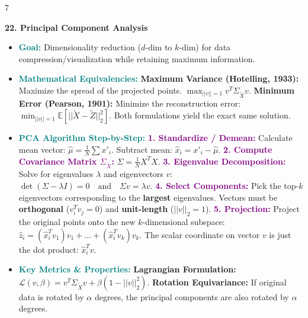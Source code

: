 \documentclass{article}
\newcommand{\hlhighlight}[1]{\par\vspace{1.5pt}\noindent\colorbox{yellow!50}{\parbox{\dimexpr\columnwidth-2\fboxsep\relax}{\textbf{#1}}}\par\vspace{0.5pt}}
\newcommand{\sectitle}[1]{\par\textbf{\color{blue!70!black}{#1}}\par}
\newcommand{\concept}[1]{\textcolor{teal}{\textbf{#1}}}
\newcommand{\procname}[1]{\textcolor{purple}{\textbf{#1}}}
\newcommand{\lbl}[1]{\textcolor{green!60!black}{\textbf{#1}}}
\begin{document}
\begin{multicols}{7}
\hlhighlight{22. Principal Component Analysis}
\sectitle{Dimensionality Reduction}
\begin{itemize}
    \item \concept{Goal:} Dimensionality reduction ($d$-dim to $k$-dim) for data compression/visualization while retaining maximum information.
    \item \concept{Mathematical Equivalencies:} \lbl{Maximum Variance (Hotelling, 1933):} Maximize the spread of the projected points. $\max_{||v||=1} v^T \Sigma_{\tilde{X}} v$. \lbl{Minimum Error (Pearson, 1901):} Minimize the reconstruction error: $\min_{||v||=1} \mathbb{E}[||\tilde{X} - \tilde{Z}||_2^2]$. Both formulations yield the exact same solution.
    \item \concept{PCA Algorithm Step-by-Step:} \procname{1. Standardize / Demean:} Calculate mean vector: $\hat{\mu} = \frac{1}{N} \sum x'_i$. Subtract mean: $\hat{x}_i = x'_i - \hat{\mu}$. \procname{2. Compute Covariance Matrix $\Sigma_{\tilde{X}}$:} $\Sigma = \frac{1}{N} X^T X$. \procname{3. Eigenvalue Decomposition:} Solve for eigenvalues $\lambda$ and eigenvectors $v$: $\det(\Sigma - \lambda I) = 0 \quad \text{and} \quad \Sigma v = \lambda v$. \procname{4. Select Components:} Pick the top-$k$ eigenvectors corresponding to the \lbl{largest} eigenvalues. Vectors must be \lbl{orthogonal} ($v_i^T v_j = 0$) and \lbl{unit-length} ($||v||_2 = 1$). \procname{5. Projection:} Project the original points onto the new $k$-dimensional subspace: $\hat{z}_i = (\hat{x}_i^T v_1) v_1 + \dots + (\hat{x}_i^T v_k) v_k$. The scalar coordinate on vector $v$ is just the dot product: $\hat{x}_i^T v$.
    \item \concept{Key Metrics \& Properties:} \lbl{Lagrangian Formulation:} $\mathcal{L}(v, \beta) = v^T \Sigma_{\tilde{X}} v + \beta(1 - ||v||_2^2)$. \lbl{Rotation Equivariance:} If original data is rotated by $\alpha$ degrees, the principal components are also rotated by $\alpha$ degrees.
\end{itemize}

\end{multicols}
\end{document}
